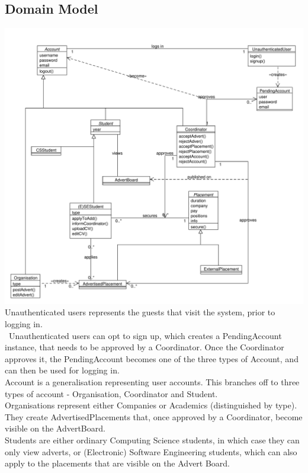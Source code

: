 \documentclass{l3deliverable}
\begin{document}
\subsection{Domain Model}
\includegraphics[scale=0.45]{domain_model_v2.pdf}\\
Unauthenticated users represents the guests that visit the system, prior to logging in.\\\
Unauthenticated users can opt to sign up, which creates a PendingAccount instance, that needs to be approved by a Coordinator. Once the Coordinator approves it, the PendingAccount becomes one of the three types of Account, and can then be used for logging in.\\

Account is a generalisation representing user accounts. This branches off to three types of account - Organisation, Coordinator and Student.\\

Organisations represent either Companies or Academics (distinguished by type). They create AdvertisedPlacements that, once approved by a Coordinator, become visible on the AdvertBoard.\\

Students are either ordinary Computing Science students, in which case they can only view adverts, or (Electronic) Software Engineering students, which can also apply to the placements that are visible on the Advert Board.\\
\end{document}
